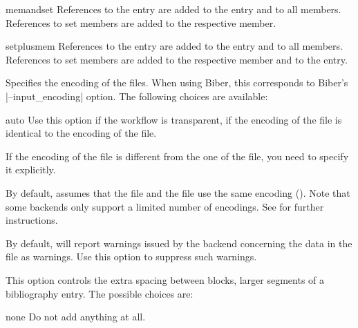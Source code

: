 \documentclass{ltxdockit}[2011/03/25]
\newcommand*{\biber}{Biber\xspace}
\begin{document}
\begin{optionlist}
\begin{valuelist}
\item[memandset] References to the  entry are added to the  entry and to all members. References to set members are added to the respective member.

\item[setplusmem] References to the  entry are added to the  entry and to all members. References to set members are added to the respective member and to the  entry.

\end{valuelist}


Specifies the encoding of the  files. When using \biber, this corresponds to \biber's |--input_encoding| option. The following choices are available:

\begin{valuelist}

\item[auto] Use this option if the workflow is transparent, \ie if the encoding of the  file is identical to the encoding of the  file.

\item[\prm{encoding}] If the encoding of the  file is different from the one of the  file, you need to specify it explicitly.

\end{valuelist}

By default,  assumes that the  file and the  file use the same encoding (). Note that some backends only support a limited number of encodings. See  for further instructions.


By default,  will report warnings issued by the backend concerning the data in the  file as \latex warnings. Use this option to suppress such warnings.


This option controls the extra spacing between blocks, \ie larger segments of a bibliography entry. The possible choices are:

\begin{valuelist}

\item[none] Do not add anything at all.


\end{valuelist}
\end{optionlist}
\end{document}
